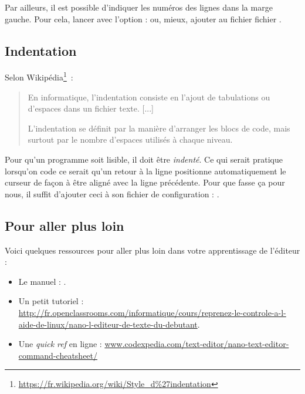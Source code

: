 \documentclass[a4paper,11pt]{style-esi/td}
\begin{document}
		Par ailleurs, il est possible d'indiquer les numéros des 
		lignes dans la
		marge gauche. Pour cela, lancer  avec l'option 
		 :  ou, mieux, 
	    ajouter  au fichier 
	    fichier .
			
	\subsection{Indentation}
				 
        Selon Wikipédia\footnote{\url{https://fr.wikipedia.org/wiki/Style_d\%27indentation}}~:
        \begin{quote}
        En informatique, l'indentation consiste en l'ajout de tabulations ou 
        d'espaces dans un fichier texte. [...]

        L'indentation se définit par la manière d'arranger les blocs de code, 
        mais surtout par le nombre d'espaces utilisés à chaque niveau. 
        \end{quote}
        
		Pour qu'un programme soit lisible, 
		il doit être \textit{indenté}. 
		Ce qui serait pratique lorsqu'on code ce serait qu'un retour à la ligne 
		positionne automatiquement le curseur de façon à être 
		aligné avec la ligne précédente. 
		Pour que  fasse ça pour nous, 
		il suffit d'ajouter	ceci à son fichier de configuration : .
			
	\subsection{Pour aller plus loin} 
		
		Voici quelques ressources pour aller plus loin dans votre apprentissage de l'éditeur :
		\begin{itemize}
		\item Le manuel : .
		\item Un petit tutoriel : 
			\\{\tiny\url{http://fr.openclassrooms.com/informatique/cours/reprenez-le-controle-a-l-aide-de-linux/nano-l-editeur-de-texte-du-debutant}}.
		\item Une \textit{quick ref} en ligne : 
		\url{www.codexpedia.com/text-editor/nano-text-editor-command-cheatsheet/}
		\end{itemize}	

\end{document}

